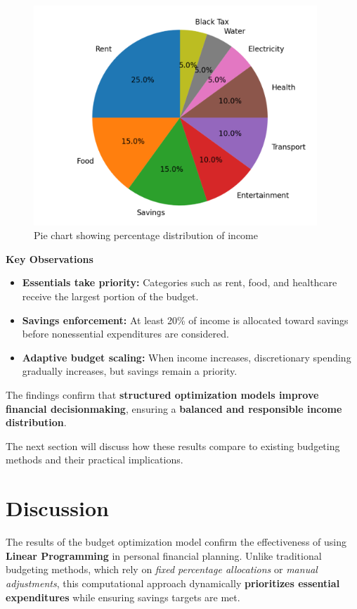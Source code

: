 \documentclass{article}
\begin{document}
\begin{figure}[h!]
    \centering
    \includegraphics[width=0.95\textwidth]{piebudget.png}
    \caption{Pie chart showing percentage distribution of income}
    \label{fig:pie_chart}
\end{figure}

\textbf{Key Observations} \\
\begin{itemize}
    \item \textbf{Essentials take priority:} Categories such as rent, food, and healthcare receive the largest portion of the budget.
    \item \textbf{Savings enforcement:} At least 20\% of income is allocated toward savings before nonessential expenditures are considered.
    \item \textbf{Adaptive budget scaling:} When income increases, discretionary spending gradually increases, but savings remain a priority.
\end{itemize}

The findings confirm that \textbf{structured optimization models improve financial decisionmaking}, ensuring a \textbf{balanced and responsible income distribution}.

The next section will discuss how these results compare to existing budgeting methods and their practical implications.

\section{Discussion}

The results of the budget optimization model confirm the effectiveness of using \textbf{Linear Programming} in personal financial planning. Unlike traditional budgeting methods, which rely on \textit{fixed percentage allocations} or \textit{manual adjustments}, this computational approach dynamically \textbf{prioritizes essential expenditures} while ensuring savings targets are met.
\end{document}
